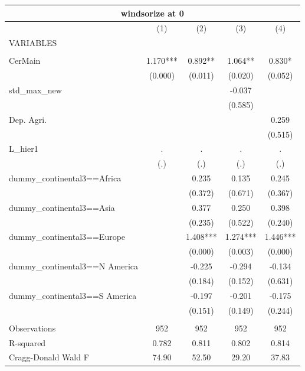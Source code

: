 \begin{tabular}{lcccc}
\multicolumn{5}{c}{windsorize at 0} \\ \hline
 & (1) & (2) & (3) & (4) \\
VARIABLES &  &  &  &  \\ \hline
 &  &  &  &  \\
CerMain & 1.170*** & 0.892** & 1.064** & 0.830* \\
 & (0.000) & (0.011) & (0.020) & (0.052) \\
std\_max\_new &  &  & -0.037 &  \\
 &  &  & (0.585) &  \\
Dep. Agri. &  &  &  & 0.259 \\
 &  &  &  & (0.515) \\
L\_hier1 & . & . & . & . \\
 & (.) & (.) & (.) & (.) \\
dummy\_continental3==Africa &  & 0.235 & 0.135 & 0.245 \\
 &  & (0.372) & (0.671) & (0.367) \\
dummy\_continental3==Asia &  & 0.377 & 0.250 & 0.398 \\
 &  & (0.235) & (0.522) & (0.240) \\
dummy\_continental3==Europe &  & 1.408*** & 1.274*** & 1.446*** \\
 &  & (0.000) & (0.003) & (0.000) \\
dummy\_continental3==N America &  & -0.225 & -0.294 & -0.134 \\
 &  & (0.184) & (0.152) & (0.631) \\
dummy\_continental3==S America &  & -0.197 & -0.201 & -0.175 \\
 &  & (0.151) & (0.149) & (0.244) \\
 &  &  &  &  \\
Observations & 952 & 952 & 952 & 952 \\
R-squared & 0.782 & 0.811 & 0.802 & 0.814 \\
 Cragg-Donald Wald F & 74.90 & 52.50 & 29.20 & 37.83 \\ \hline
\end{tabular}
